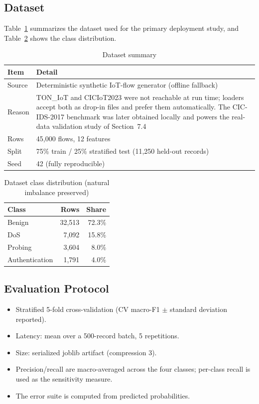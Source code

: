 \documentclass[12pt,a4paper]{article}
\begin{document}
\subsection{Dataset}
Table~\ref{tab:dataset} summarizes the dataset used for the primary deployment study,
and Table~\ref{tab:classdist} shows the class distribution.

\begin{table}[H]
\caption{Dataset summary}
\label{tab:dataset}
\centering
\small
\begin{tabular}{p{2.6cm}p{10.4cm}}
\toprule
\textbf{Item} & \textbf{Detail}\\
\midrule
Source & Deterministic synthetic IoT-flow generator (offline fallback)\\
Reason & TON\_IoT and CICIoT2023 were not reachable at run time; loaders accept both as drop-in files and prefer them automatically. The CIC-IDS-2017 benchmark was later obtained locally and powers the real-data validation study of Section~7.4\\
Rows & 45,000 flows, 12 features\\
Split & 75\% train / 25\% stratified test (11,250 held-out records)\\
Seed & 42 (fully reproducible)\\
\bottomrule
\end{tabular}
\end{table}

\begin{table}[H]
\caption{Dataset class distribution (natural imbalance preserved)}
\label{tab:classdist}
\centering
\small
\begin{tabular}{lrr}
\toprule
\textbf{Class} & \textbf{Rows} & \textbf{Share}\\
\midrule
Benign & 32,513 & 72.3\%\\
DoS & 7,092 & 15.8\%\\
Probing & 3,604 & 8.0\%\\
Authentication & 1,791 & 4.0\%\\
\bottomrule
\end{tabular}
\end{table}

\subsection{Evaluation Protocol}
\begin{itemize}
  \item Stratified 5-fold cross-validation (CV macro-F1 $\pm$ standard deviation
        reported).
  \item Latency: mean over a 500-record batch, 5 repetitions.
  \item Size: serialized joblib artifact (compression 3).
  \item Precision/recall are macro-averaged across the four classes; per-class recall
        is used as the sensitivity measure.
  \item The error suite is computed from predicted probabilities.
\end{itemize}
\end{document}
